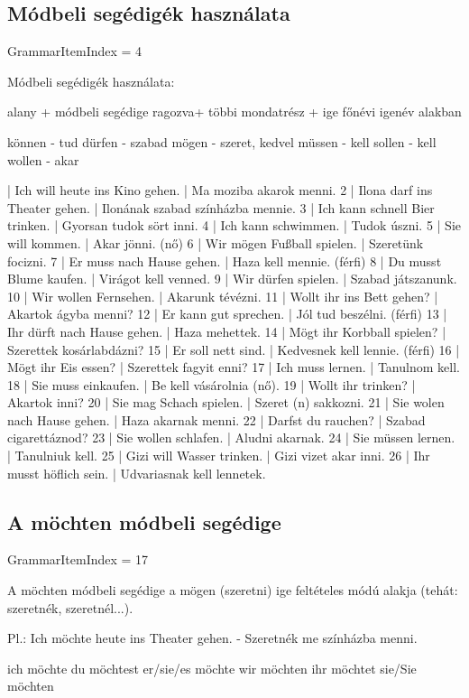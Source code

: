 \documentclass{article}
\newenvironment{desc}{\verbatim}{\endverbatim}
\newenvironment{exmp}{\verbatim}{\endverbatim}
\begin{document}
\subsection{Módbeli segédigék használata}

GrammarItemIndex = 4

\begin{desc}
Módbeli segédigék használata:

alany + módbeli segédige ragozva+ többi mondatrész + ige főnévi igenév alakban 

können - tud
dürfen - szabad
mögen - szeret, kedvel
müssen - kell
sollen - kell
wollen - akar
\end{desc}

\begin{exmp}
1 | Ich will heute ins Kino gehen. | Ma moziba akarok menni.
2 | Ilona darf ins Theater gehen. | Ilonának szabad színházba mennie.
3 | Ich kann schnell Bier trinken. | Gyorsan tudok sört inni.
4 | Ich kann schwimmen. | Tudok úszni.
5 | Sie will kommen. | Akar jönni. (nő)
6 | Wir mögen Fußball spielen. | Szeretünk focizni.
7 | Er muss nach Hause gehen. | Haza kell mennie. (férfi)
8 | Du musst Blume kaufen. | Virágot kell venned.
9 | Wir dürfen spielen. | Szabad játszanunk.
10 | Wir wollen Fernsehen. | Akarunk tévézni.
11 | Wollt ihr ins Bett gehen? | Akartok ágyba menni?
12 | Er kann gut sprechen. | Jól tud beszélni. (férfi)
13 | Ihr dürft nach Hause gehen. | Haza mehettek.
14 | Mögt ihr Korbball spielen? | Szerettek kosárlabdázni?
15 | Er soll nett sind. | Kedvesnek kell lennie. (férfi)
16 | Mögt ihr Eis essen? | Szerettek fagyit enni?
17 | Ich muss lernen. | Tanulnom kell.
18 | Sie muss einkaufen. | Be kell vásárolnia (nő).
19 | Wollt ihr trinken? | Akartok inni?
20 | Sie mag Schach spielen. | Szeret (n) sakkozni.
21 | Sie wolen nach Hause gehen. | Haza akarnak menni.
22 | Darfst du rauchen? | Szabad cigarettáznod?
23 | Sie wollen schlafen. | Aludni akarnak.
24 | Sie müssen lernen. | Tanulniuk kell.
25 | Gizi will Wasser trinken. | Gizi vizet akar inni.
26 | Ihr musst höflich sein. | Udvariasnak kell lennetek.
\end{exmp}

\subsection{A möchten módbeli segédige}

GrammarItemIndex = 17

\begin{desc}
A möchten módbeli segédige a mögen (szeretni) ige feltételes módú
alakja (tehát: szeretnék, szeretnél...).

Pl.: Ich möchte heute ins Theater gehen. - Szeretnék me színházba menni.

ich möchte 
du möchtest 
er/sie/es möchte 
wir möchten 
ihr möchtet 
sie/Sie möchten
\end{desc}
\end{document}
